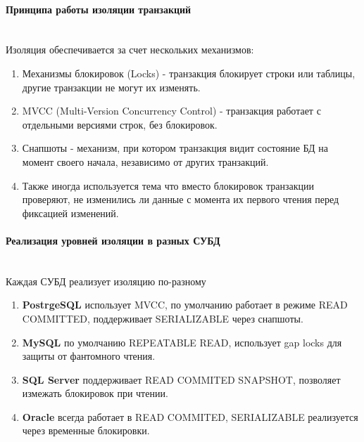  \paragraph{Принципа работы изоляции транзакций} ~\\

 Изоляция обеспечивается за счет нескольких механизмов:
 \begin{enumerate}
     \item Механизмы блокировок (Locks) - транзакция блокирует строки или таблицы, другие транзакции не могут их изменять.
     \item MVCC (Multi-Version Concurrency Control) - транзакция работает с отдельными версиями строк, без блокировок.
     \item Снапшоты - механизм, при котором транзакция видит состояние БД на момент своего начала, независимо от других транзакций.
     \item Также иногда используется тема что вместо блокировок транзакции проверяют, не изменились ли данные с момента их первого чтения перед фиксацией изменений.
 \end{enumerate}
 
 \paragraph{Реализация уровней изоляции в разных СУБД} ~\\
 
 Каждая СУБД реализует изоляцию по-разному \autocites[§2]{PostgreSQLdocc13}[§17.7.2.1]{Mysqldoc4}{MicrosoftLearnSQLserverIsolation}{oracledbdoc5}
 
 \begin{enumerate}
     \item \textbf{PostrgeSQL} использует MVCC, по умолчанию работает в режиме READ COMMITTED, поддерживает SERIALIZABLE через снапшоты.
     \item \textbf{MySQL} по умолчанию REPEATABLE READ, использует gap locks для защиты от фантомного чтения.
     \item \textbf{SQL Server} поддерживает READ COMMITED SNAPSHOT, позволяет измежать блокировок при чтении.
     \item \textbf{Oracle} всегда работает в READ COMMITED, SERIALIZABLE реализуется через временные блокировки.
 \end{enumerate}
 
